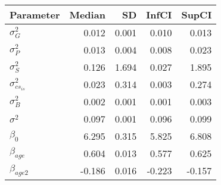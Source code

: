 \begin{table}[ht]
\centering
\begin{tabular}{lrrrr}
  \hline
Parameter & Median & SD & InfCI & SupCI \\ 
  \hline
$\sigma^{2}_{G}$ & 0.012 & 0.001 & 0.010 & 0.013 \\ 
  $\sigma^{2}_{P}$ & 0.013 & 0.004 & 0.008 & 0.023 \\ 
  $\sigma^{2}_{S}$ & 0.126 & 1.694 & 0.027 & 1.895 \\ 
  $\sigma^{2}_{cs_{is}}$ & 0.023 & 0.314 & 0.003 & 0.274 \\ 
  $\sigma^{2}_{B}$ & 0.002 & 0.001 & 0.001 & 0.003 \\ 
  $\sigma^{2}$ & 0.097 & 0.001 & 0.096 & 0.099 \\ 
  $\beta_{0}$ & 6.295 & 0.315 & 5.825 & 6.808 \\ 
  $\beta_{age}$ & 0.604 & 0.013 & 0.577 & 0.625 \\ 
  $\beta_{age2}$ & -0.186 & 0.016 & -0.223 & -0.157 \\ 
   \hline
\end{tabular}
\end{table}
